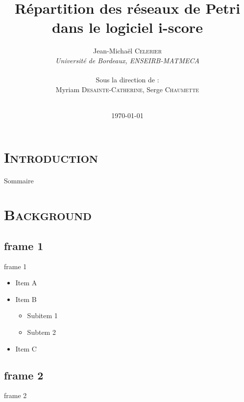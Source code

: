 \documentclass[xcolor=x11names,compress]{beamer}
\renewcommand{\(}{\begin{columns}}
\renewcommand{\)}{\end{columns}}
\newcommand{\<}[1]{\begin{column}{#1}}
\renewcommand{\>}{\end{column}}
\begin{document}
\section{\scshape Introduction}
\begin{frame}
\title{Répartition des réseaux de Petri dans le logiciel i-score}

\author{
	Jean-Michaël \textsc{Celerier}\\
	{\it Université de Bordeaux, ENSEIRB-MATMECA}\\ ~ \\
	Sous la direction de : \\
	Myriam \textsc{Desainte-Catherine}, Serge \textsc{Chaumette}\\
}
\date{
	\\
	\vspace{1cm}
	\today
}
\titlepage
\end{frame}

\begin{frame}{Sommaire}
\tableofcontents
\end{frame}

\section{\scshape Background}
\subsection{frame 1}
\begin{frame}{frame 1}
\begin{itemize}
\item Item A
\item Item B
\begin{itemize}
\item Subitem 1
\item Subtem 2
\end{itemize}
\item Item C
\end{itemize}
\end{frame}

\subsection{frame 2}
\begin{frame}{frame 2}

\end{frame}
\end{document}
